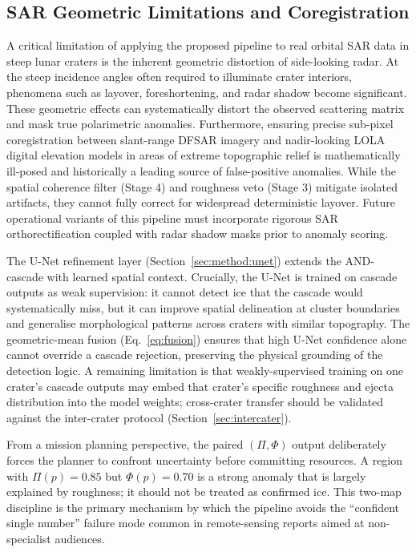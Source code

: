 \documentclass[10pt,conference]{IEEEtran}
\begin{document}
\subsection{SAR Geometric Limitations and Coregistration}
A critical limitation of applying the proposed pipeline to real orbital SAR data in steep lunar craters is the inherent geometric distortion of side-looking radar. At the steep incidence angles often required to illuminate crater interiors, phenomena such as layover, foreshortening, and radar shadow become significant. These geometric effects can systematically distort the observed scattering matrix and mask true polarimetric anomalies. Furthermore, ensuring precise sub-pixel coregistration between slant-range DFSAR imagery and nadir-looking LOLA digital elevation models in areas of extreme topographic relief is mathematically ill-posed and historically a leading source of false-positive anomalies. While the spatial coherence filter (Stage 4) and roughness veto (Stage 3) mitigate isolated artifacts, they cannot fully correct for widespread deterministic layover. Future operational variants of this pipeline must incorporate rigorous SAR orthorectification coupled with radar shadow masks prior to anomaly scoring.

The U-Net refinement layer (Section~\ref{sec:method:unet}) extends
the AND-cascade with learned spatial context.
Crucially, the U-Net is trained on cascade outputs as weak supervision:
it cannot detect ice that the cascade would systematically miss, but
it can improve spatial delineation at cluster boundaries and generalise
morphological patterns across craters with similar topography.
The geometric-mean fusion (Eq.~\ref{eq:fusion}) ensures that
high U-Net confidence alone cannot override a cascade rejection,
preserving the physical grounding of the detection logic.
A remaining limitation is that weakly-supervised training on one
crater's cascade outputs may embed that crater's specific
roughness and ejecta distribution into the model weights; cross-crater
transfer should be validated against the inter-crater protocol
(Section~\ref{sec:intercater}).

From a mission planning perspective, the paired $(\Pi, \Phi)$
output deliberately forces the planner to confront uncertainty
before committing resources.
A region with $\Pi(p) = 0.85$ but $\Phi(p) = 0.70$ is a strong
anomaly that is largely explained by roughness; it should not be
treated as confirmed ice.
This two-map discipline is the primary mechanism by which the pipeline
avoids the ``confident single number'' failure mode common in
remote-sensing reports aimed at non-specialist audiences.
\end{document}
